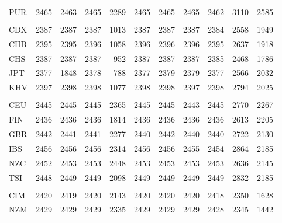 \documentclass[twoside,openright]{report}
\begin{document}
\begin{table}
{\begin{tabular}[t]{lrrrrrrrrrr}
\hspace{1em}PUR & 2465 & 2463 & 2465 & 2289 & 2465 & 2465 & 2465 & 2462 & 3110 & 2585\\
\addlinespace[0.3em]
\multicolumn{11}{l}{\textbf{EAS}}\\
\hspace{1em}CDX & 2387 & 2387 & 2387 & 1013 & 2387 & 2387 & 2387 & 2384 & 2558 & 1949\\
\hspace{1em}CHB & 2395 & 2395 & 2396 & 1058 & 2396 & 2396 & 2396 & 2395 & 2637 & 1918\\
\hspace{1em}CHS & 2387 & 2387 & 2387 & 952 & 2387 & 2387 & 2387 & 2385 & 2468 & 1786\\
\hspace{1em}JPT & 2377 & 1848 & 2378 & 788 & 2377 & 2379 & 2379 & 2377 & 2566 & 2032\\
\hspace{1em}KHV & 2397 & 2398 & 2398 & 1077 & 2398 & 2398 & 2397 & 2398 & 2794 & 2025\\
\addlinespace[0.3em]
\multicolumn{11}{l}{\textbf{EUR}}\\
\hspace{1em}CEU & 2445 & 2445 & 2445 & 2365 & 2445 & 2445 & 2443 & 2445 & 2770 & 2267\\
\hspace{1em}FIN & 2436 & 2436 & 2436 & 1814 & 2436 & 2436 & 2436 & 2436 & 2613 & 2205\\
\hspace{1em}GBR & 2442 & 2441 & 2441 & 2277 & 2440 & 2442 & 2440 & 2440 & 2722 & 2130\\
\hspace{1em}IBS & 2456 & 2456 & 2456 & 2314 & 2456 & 2456 & 2455 & 2454 & 2864 & 2185\\
\hspace{1em}NZC & 2452 & 2453 & 2453 & 2448 & 2453 & 2453 & 2453 & 2453 & 2636 & 2145\\
\hspace{1em}TSI & 2448 & 2449 & 2449 & 2098 & 2449 & 2449 & 2449 & 2449 & 2832 & 2185\\
\addlinespace[0.3em]
\multicolumn{11}{l}{\textbf{POL}}\\
\hspace{1em}CIM & 2420 & 2419 & 2420 & 2143 & 2420 & 2420 & 2420 & 2418 & 2350 & 1628\\
\hspace{1em}NZM & 2429 & 2429 & 2429 & 2335 & 2429 & 2429 & 2429 & 2428 & 2345 & 1442\\

\end{tabular}}
\end{table}
\end{document}
